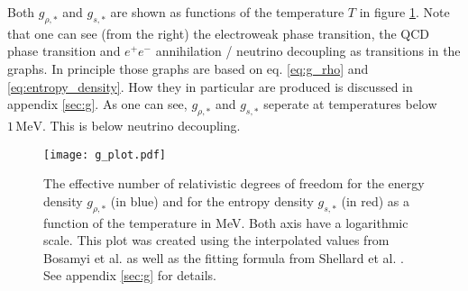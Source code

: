 \documentclass[twoside,a4paper, 12pt]{article}
\numberwithin{equation}{section}
\begin{document}
Both $g_{\rho, *}$ and $g_{s, *}$ are shown as functions of the temperature $T$
in figure \ref{fig:g_plot}.
Note that one can see (from the right) the electroweak phase transition, the QCD phase transition and $e^+ e^-$ annihilation / neutrino decoupling
as transitions in the graphs.
In principle those graphs are based on eq. \eqref{eq:g_rho} and \eqref{eq:entropy_density}. How they in particular are produced is discussed in appendix \ref{sec:g}.
As one can see, $g_{\rho, *}$ and $g_{s, *}$ seperate at temperatures below $1 \,\mathrm{MeV}$.
This is below neutrino decoupling.
\begin{figure}[H]
    \centering
    \texttt{[image: g\_plot.pdf]}
    \caption{The effective number
    of relativistic degrees of freedom for
    the energy density $g_{\rho, *}$ (in blue) and for the entropy density $g_{s, *}$ (in red) as a function of the temperature in MeV. Both axis have a logarithmic scale.
    This plot was created using the interpolated values from Bosamyi et al. \cite{LatticQCD4Cosmo}
    as well as the fitting formula from Shellard et al. \cite{AxionCosmoRev}. See appendix \ref{sec:g}
    for details.
    }
    \label{fig:g_plot}
\end{figure}
\end{document}
